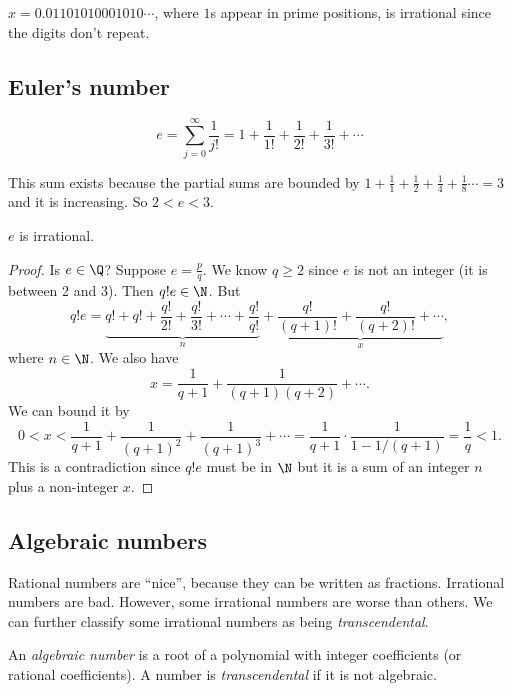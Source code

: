 \documentclass[a4paper]{article}
\begin{document}
\begin{eg}
  $x = 0.01101010001010\cdots$, where $1$s appear in prime positions, is irrational since the digits don't repeat.
\end{eg}
\subsection{Euler's number}
\begin{defi}
  \[
    e = \sum_{j=0}^\infty \frac{1}{j!} = 1 + \frac{1}{1!} + \frac{1}{2!} + \frac{1}{3!} + \cdots
  \]
\end{defi}
This sum exists because the partial sums are bounded by $1 + \frac{1}{1} + \frac{1}{2} + \frac{1}{4} + \frac{1}{8}\cdots = 3$ and it is increasing. So $2 < e < 3$.

\begin{prop}
  $e$ is irrational.
\end{prop}

\begin{proof}
  Is $e\in \Q$? Suppose $e = \frac{p}{q}$. We know $q\geq 2$ since $e$ is not an integer (it is between 2 and 3). Then $q!e \in \N$. But
  \[
    q!e = \underbrace{q! + q! + \frac{q!}{2!} + \frac{q!}{3!} + \cdots + \frac{q!}{q!}}_{n} + \underbrace{\frac{q!}{(q + 1)!} + \frac{q!}{(q + 2)!} + \cdots}_{x},
  \]
  where $n \in \N$. We also have
  \[
    x = \frac{1}{q + 1} + \frac{1}{(q + 1)(q + 2)} + \cdots.
  \]
  We can bound it by
  \[
    0 < x < \frac{1}{q+1} +\frac{1}{(q + 1)^2} + \frac{1}{(q + 1)^3} + \cdots = \frac{1}{q + 1}\cdot \frac{1}{1 - 1/(q + 1)} = \frac{1}{q} < 1.
  \]
  This is a contradiction since $q!e$ must be in $\N$ but it is a sum of an integer $n$ plus a non-integer $x$.
\end{proof}

\subsection{Algebraic numbers}
Rational numbers are ``nice'', because they can be written as fractions. Irrational numbers are bad. However, some irrational numbers are worse than others. We can further classify some irrational numbers as being \emph{transcendental}.
\begin{defi}
  An \emph{algebraic number} is a root of a polynomial with integer coefficients (or rational coefficients). A number is \emph{transcendental} if it is not algebraic.
\end{defi}
\end{document}
